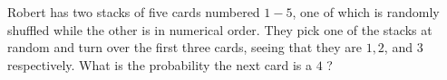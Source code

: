 Robert has two stacks of five cards numbered $1-5$, one of which is randomly shuffled while the other is in numerical order. They pick one of the stacks at random and turn over the first three cards, seeing that they are $1,2$, and $3$ respectively. What is the probability the next card is a $4$ ?